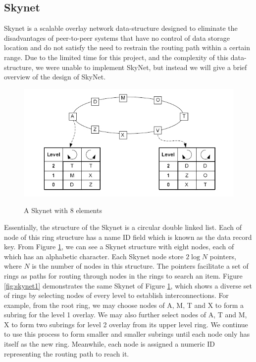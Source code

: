 \documentclass[oribibl]{llncs}
\begin{document}
\subsection{Skynet}

Skynet is a scalable overlay network data-structure designed to eliminate the disadvantages of peer-to-peer systems that have no control of data storage location and do not satisfy the need to restrain the routing path within a certain range. Due to the limited time for this project, and the complexity of this data-structure, we were unable to implement SkyNet, but instead we will give a brief overview of the design of SkyNet.

\begin{figure}[here]
\center\underline{}
\includegraphics[width=12cm]{images/skynet}
\caption{A Skynet with 8 elements}
\label{fig:skynet}
\end{figure}

Essentially, the structure of the Skynet is a circular double linked list. Each of node of this ring structure has a name ID field which is known as the data record key. From Figure \ref{fig:skynet}, we can see a Skynet structure \cite{skip_net} with eight nodes, each of which has an alphabetic character. Each Skynet node store $2\log{N}$ pointers, where $N$ is the number of nodes in this structure. The pointers facilitate a set of rings as paths for routing through nodes in the rings to search an item. Figure \ref{fig:skynet1} demonstrates the same Skynet of Figure \ref{fig:skynet}, which shows a diverse set of rings by selecting nodes of every level to establish interconnections. For example, from the root ring, we may choose nodes of A, M, T and X to form a subring for the level 1 overlay. We may also further select nodes of A, T and M, X to form two subrings for level 2 overlay from its upper level ring. We continue to use this process to form smaller and smaller subrings until each node only has itself as the new ring. Meanwhile, each node is assigned a numeric ID representing the routing path to reach it.
\end{document}
